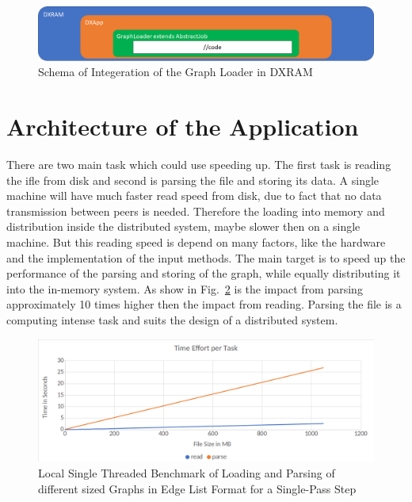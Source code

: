 \begin{figure}[H]
	\centering
	\includegraphics[width=1.0\linewidth]{img/schema.png}
	\caption{Schema of Integeration of the Graph Loader in DXRAM}
	\label{integration}
\end{figure}
\newpage
\section{Architecture of the Application}

There are two main task which could use speeding up. The first task is reading the ifle from disk and second is parsing the file and storing its data. A single machine will have much faster read speed from disk, due to fact that no data transmission between peers is needed. Therefore the loading into memory and distribution inside the distributed system, maybe slower then on a single machine. But this reading speed is depend on many factors, like the hardware and the implementation of the input methods. The main target is to speed up the performance of the parsing and storing of the graph, while equally distributing it into the in-memory system. As show in Fig.~\ref{loadingparsing} is the impact from parsing approximately 10 times higher then the impact from reading. Parsing the file is a computing intense task and suits the design of a distributed system.

\begin{figure}[H]
	\centering
	\includegraphics[width=1.0\linewidth]{img/tasktime.png}
	\caption{Local Single Threaded Benchmark of Loading and Parsing of different sized Graphs in Edge List Format for a Single-Pass Step}
	\label{loadingparsing}
\end{figure}


